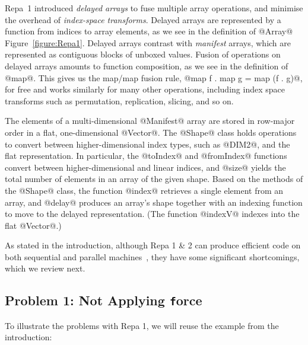 Repa~1 introduced \emph{delayed arrays} to fuse multiple array operations, and minimise the overhead of \emph{index-space transforms}. Delayed arrays are represented by a function from indices to array elements, as we see in the definition of @Array@ Figure~\ref{figure:Repa1}. Delayed arrays contrast with \emph{manifest} arrays, which are represented as contiguous blocks of unboxed values. Fusion of operations on delayed arrays amounts to function composition, as we see in the definition of @map@. This gives us the map/map fusion rule, @map f . map g = map (f . g)@, for free and works similarly for many other operations, including index space transforms such as permutation, replication, slicing, and so on.

The elements of a multi-dimensional @Manifest@ array are stored in row-major order in a flat, one-dimensional @Vector@. The @Shape@ class holds operations to convert between higher-dimensional index types, such as @DIM2@, and the flat representation. In particular, the @toIndex@ and @fromIndex@ functions convert between higher-dimensional and linear indices, and @size@ yields the total number of elements in an array of the given shape. Based on the methods of the @Shape@ class, the function @index@ retrieves a single element from an array, and @delay@ produces an array's shape together with an indexing function to move to the delayed representation. (The function @indexV@ indexes into the flat @Vector@.)

As stated in the introduction, although Repa 1 \& 2 can produce efficient code on both sequential and parallel machines~\cite{Keller:Repa,Lippmeier:Stencil}, they have some significant shortcomings, which we review next.


\subsection{Problem 1: Not Applying {\texttt force}}
\label{section:force}

To illustrate the problems with Repa 1, we will reuse the example from the introduction:
%
\begin{small}
\end{small}

